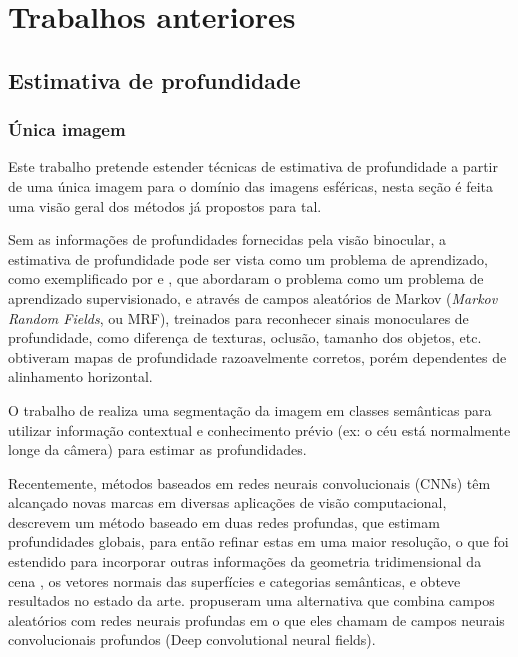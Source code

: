 \documentclass[cic,tc]{iiufrgs}
\begin{document}
\chapter{Trabalhos anteriores}

\section{Estimativa de profundidade}

\subsection{Única imagem}

Este trabalho pretende estender técnicas de estimativa de profundidade a partir de uma única imagem para o domínio das imagens esféricas, nesta seção é feita uma visão geral dos métodos já propostos para tal.

Sem as informações de profundidades fornecidas pela visão binocular, a estimativa de profundidade pode ser vista como um problema de aprendizado, como exemplificado por \citet{Saxena2005} e \citet{Saxena2008}, que abordaram o problema como um problema de aprendizado supervisionado, e através de campos aleatórios de Markov (\textit{Markov Random Fields}, ou MRF), treinados para reconhecer sinais monoculares de profundidade, como diferença de texturas, oclusão, tamanho dos objetos, etc. obtiveram mapas de profundidade razoavelmente corretos, porém dependentes de alinhamento horizontal.

O trabalho de \citet{Liu2010} realiza uma segmentação da imagem em classes semânticas para utilizar informação contextual e conhecimento prévio (ex: o céu está normalmente longe da câmera) para estimar as profundidades.

Recentemente, métodos baseados em redes neurais convolucionais (CNNs) têm alcançado novas marcas em diversas aplicações de visão computacional, \citet{Eigen2014} descrevem um método baseado em duas redes profundas, que estimam profundidades globais, para então refinar estas em uma maior resolução, o que foi estendido para incorporar outras informações da geometria tridimensional da cena \citep{Eigen2015}, os vetores normais das superfícies e categorias semânticas, e obteve resultados no estado da arte. \citet{Fayao2015} propuseram uma alternativa que combina campos aleatórios com redes neurais profundas em o que eles chamam de campos neurais convolucionais profundos (Deep convolutional neural fields).
\end{document}
